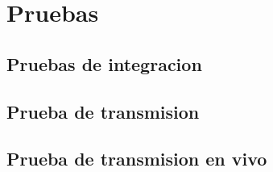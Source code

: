 \chapter{Pruebas}

\section{Pruebas de integracion}

\section{Prueba de transmision}

\section{Prueba de transmision en vivo}